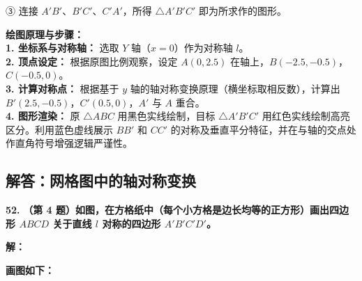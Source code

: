 ③ 连接 $A'B'$、$B'C'、C'A'$，所得 $\triangle A'B'C'$ 即为所求作的图形。

\vspace{0.4cm}
{\small\color{blue!70!black}
\textbf{绘图原理与步骤：}\\
\textbf{1. 坐标系与对称轴：} 选取 $Y$ 轴（$x=0$）作为对称轴 $l$。\\
\textbf{2. 顶点设定：} 根据原图比例观察，设定 $A(0, 2.5)$ 在轴上，$B(-2.5, -0.5)$，$C(-0.5, 0)$。\\
\textbf{3. 计算对称点：} 根据基于 $y$ 轴的轴对称变换原理（横坐标取相反数），计算出 $B'(2.5, -0.5)$，$C'(0.5, 0)$，$A'$ 与 $A$ 重合。\\
\textbf{4. 图形渲染：} 原 $\triangle ABC$ 用黑色实线绘制，目标 $\triangle A'B'C'$ 用红色实线绘制高亮区分。利用蓝色虚线展示 $BB'$ 和 $CC'$ 的对称及垂直平分特征，并在与轴的交点处作直角符号增强逻辑严谨性。
}

\newpage

\newpage

\subsection{解答：网格图中的轴对称变换}

\vspace{0.6cm}

\textbf{\LARGE 52.} \textbf{（第 4 题）如图，在方格纸中（每个小方格是边长均等的正方形）画出四边形 $ABCD$ 关于直线 $l$ 对称的四边形 $A'B'C'D'$。}

\vspace{0.4cm}
\textbf{解：}

\textbf{画图如下：}

